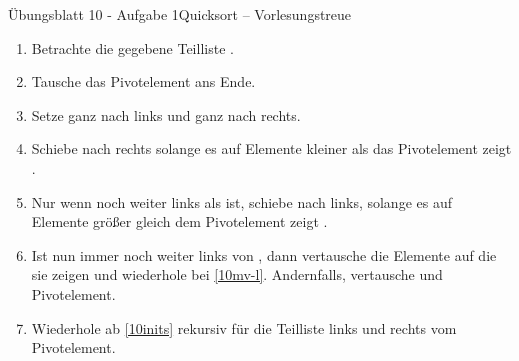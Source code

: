 \begin{frame}[c]{Übungsblatt 10 - Aufgabe 1\hfill Quicksort -- Vorlesungstreue}
    \small\begin{enumerate}[<+(1)->]
        \item\label{10inits} Betrachte die gegebene Teilliste .
        \item Tausche das Pivotelement ans Ende.
        \item Setze  ganz nach links und  ganz nach rechts. 
        \item \label{10mv-l}Schiebe  nach rechts solange es auf Elemente kleiner als das Pivotelement zeigt .
        \item Nur wenn  noch weiter links als  ist, schiebe  nach links, solange es auf Elemente größer gleich dem Pivotelement zeigt .
        \item Ist  nun immer noch weiter links von , dann vertausche die Elemente auf die sie zeigen und wiederhole bei \ref{10mv-l}. Andernfalls, vertausche  und Pivotelement.
        \item Wiederhole ab \ref{10inits} rekursiv für die Teilliste links und rechts vom Pivotelement.
    \end{enumerate}
\end{frame}



